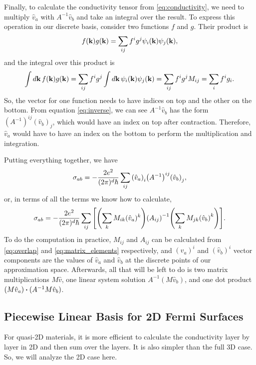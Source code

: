\documentclass[12pt]{article}
\begin{document}
Finally, to calculate the conductivity tensor from \eqref{eq:conductivity}, we need to multiply
$\hat{v}_a$ with $A^{-1}\hat{v}_b$ and take an integral over the result. To express this operation
in our discrete basis, consider two functions $f$ and $g$. Their product is
\begin{equation}
    f(\vb{k})g(\vb{k}) = \sum_{ij} f^i g^j \psi_i(\vb{k}) \psi_j(\vb{k}),
\end{equation}
and the integral over this product is
\begin{equation}
    \int\dd{\vb{k}} f(\vb{k}) g(\vb{k}) = \sum_{ij} f^i g^j \int\dd{\vb{k}}
    \psi_i(\vb{k})\psi_j(\vb{k}) = \sum_{ij} f^i g^j M_{ij} = \sum_i f^i g_i.
\end{equation}
So, the vector for one function needs to have indices on top and the other on the bottom. From
equation \eqref{eq:inverse}, we can see $A^{-1}\hat{v}_b$ has the form
$(A^{-1})^{ij} (\hat{v}_b)_j$, which would have an index on top after contraction. Therefore,
$\hat{v}_a$ would have to have an index on the bottom to perform the multiplication and integration.

Putting everything together, we have
\begin{equation}
    \sigma_{ab} = -\frac{2e^2}{(2\pi)^d\hbar} \sum_{ij} \qty(\hat{v}_a)_i
    \qty(A^{-1})^{ij} \qty(\hat{v}_b)_j,
\end{equation}
or, in terms of all the terms we know how to calculate,
\begin{equation}
    \sigma_{ab} = -\frac{2e^2}{(2\pi)^d\hbar} \sum_{ij} \qty[
    \qty(\sum_k M_{ik} (\hat{v}_a)^k) \qty(A_{ij})^{-1} \qty(\sum_k M_{jk} \qty(\hat{v}_b)^k)].
\end{equation}
To do the computation in practice, $M_{ij}$ and $A_{ij}$ can be calculated from \eqref{eq:overlap}
and \eqref{eq:matrix_elements} respectively, and $(\hat{v}_a)^i$ and $(\hat{v}_b)^i$ vector
components are the values of $\hat{v}_a$ and $\hat{v}_b$ at the discrete points of our approximation
space.  Afterwards, all that will be left to do is two matrix multiplications $M\hat{v}$, one linear
system solution $A^{-1}(M\hat{v}_b)$, and one dot product $(M\hat{v}_a)\vdot(A^{-1}M\hat{v}_b)$.

\subsection{Piecewise Linear Basis for 2D Fermi Surfaces}
For quasi-2D materials, it is more efficient to calculate the conductivity layer by layer in 2D and
then sum over the layers. It is also simpler than the full 3D case. So, we will analyze the 2D
case here.
\end{document}
